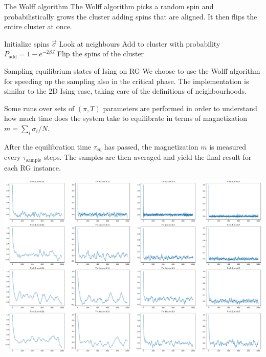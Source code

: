 \documentclass[handout]{beamer}
\begin{document}
\begin{frame}{The Wolff algorithm}
    The \alert{Wolff algorithm} picks a random spin and probabilistically grows
    the cluster adding spins that are aligned. It then flips the entire cluster
    at once. \cite[91]{newman_barkema}

    \begin{algorithm}[H]
        \begin{algorithmic}[1]
            \STATE Initialize spins $\vec \sigma$
                    \STATE Look at neighbours
                    \STATE Add to cluster with probability $P_{\text{add}} = 1-e^{-2\beta J}$
                    \ENDIF
                \ENDWHILE
                \STATE Flip the spins of the cluster
            \ENDWHILE
        \end{algorithmic}
        \caption{Wolff algorithm}
        \label{algo:wolff}
    \end{algorithm}
\end{frame}

\begin{frame}{Sampling equilibrium states of Ising on RG}
    We choose to use the \alert{Wolff algorithm} for speeding up the sampling
    also in the critical phase. The implementation is similar to the 2D Ising
    case, taking care of the definitions of neighbourhoods.

    Some runs over sets of $(\pi, T)$ parameters are performed in order to
    understand how much time does the system take to equilibrate in terms of
    magnetization $m=\sum_i \sigma_i / N$.

    After the equilibration time $\tau_{\text{eq}}$ has passed, the
    magnetization $m$ is measured every $\tau_{\text{sample}}$ steps. The
    samples are then averaged and yield the final result for each RG instance.
\end{frame}

\begin{frame}[plain]
    \centering
    \includegraphics[width=\textwidth]{wolff_mags}
\end{frame}
\end{document}
